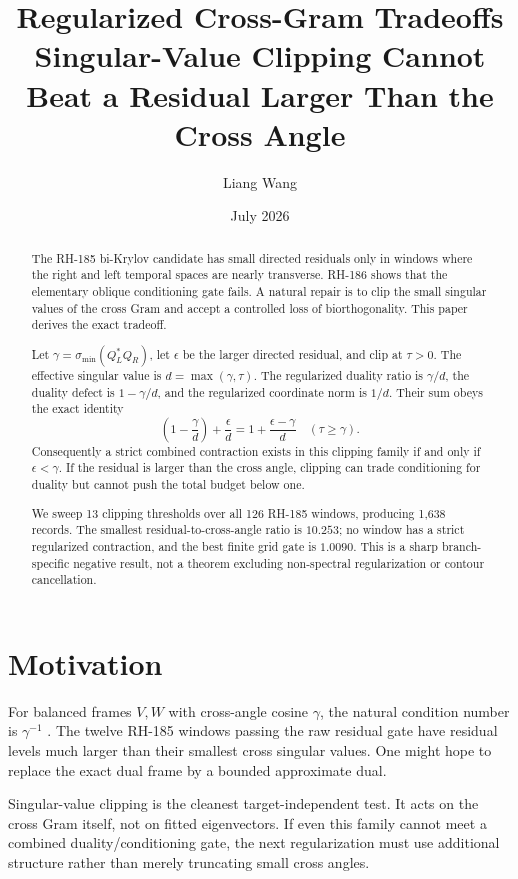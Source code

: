 \documentclass[12pt]{article}
\title{Regularized Cross-Gram Tradeoffs\\
\large Singular-Value Clipping Cannot Beat a Residual Larger Than the Cross Angle}
\author{Liang Wang}
\date{July 2026}
\theoremstyle{remark}
\begin{document}
\maketitle

\begin{abstract}
The RH-185 bi-Krylov candidate has small directed residuals only in windows
where the right and left temporal spaces are nearly transverse.  RH-186
shows that the elementary oblique conditioning gate fails.  A natural repair
is to clip the small singular values of the cross Gram and accept a controlled
loss of biorthogonality.  This paper derives the exact tradeoff.

Let $\gamma=\sigma_{\min}(Q_L^*Q_R)$, let $\epsilon$ be the larger directed
residual, and clip at $\tau>0$.  The effective singular value is
$d=\max(\gamma,\tau)$.  The regularized duality ratio is $\gamma/d$, the
duality defect is $1-\gamma/d$, and the regularized coordinate norm is
$1/d$.  Their sum obeys the exact identity
\begin{equation*}
 \left(1-\frac{\gamma}{d}\right)+\frac{\epsilon}{d}
 =1+\frac{\epsilon-\gamma}{d}
 \quad (\tau\ge\gamma).
\end{equation*}
Consequently a strict combined contraction exists in this clipping family if
and only if $\epsilon<\gamma$.  If the residual is larger than the cross
angle, clipping can trade conditioning for duality but cannot push the total
budget below one.

We sweep 13 clipping thresholds over all 126 RH-185 windows, producing 1,638
records.  The smallest residual-to-cross-angle ratio is $10.253$; no window
has a strict regularized contraction, and the best finite grid gate is
$1.0090$.  This is a sharp branch-specific negative result, not a theorem
excluding non-spectral regularization or contour cancellation.
\end{abstract}

\section{Motivation}

For balanced frames $V,W$ with cross-angle cosine $\gamma$, the natural
condition number is $\gamma^{-1}$ \citep{WangRH184,WangRH186}.  The twelve
RH-185 windows passing the raw residual gate have residual levels much larger
than their smallest cross singular values.  One might hope to replace the
exact dual frame by a bounded approximate dual.

Singular-value clipping is the cleanest target-independent test.  It acts on
the cross Gram itself, not on fitted eigenvectors.  If even this family cannot
meet a combined duality/conditioning gate, the next regularization must use
additional structure rather than merely truncating small cross angles.
\end{document}
